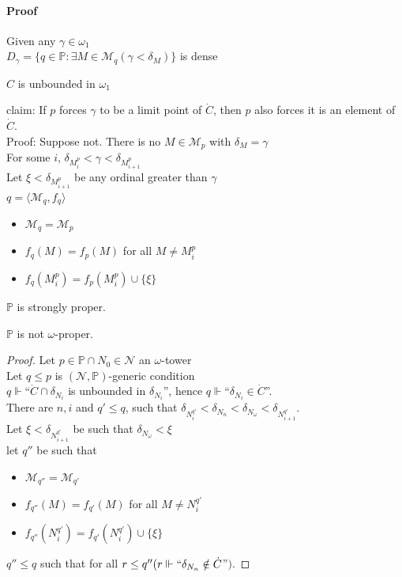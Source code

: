 \documentclass{beamer}
\begin{document}
\begin{frame}
\framesubtitle{Proof}
Given any $\gamma \in \omega_1$\\
\pause
$D_{\gamma}= \{q \in \mathbb{P} \colon \exists M \in \mathcal{M}_q(\gamma < \delta_M)\}$ is dense
\pause
\begin{center}
 $C$ is unbounded in $\omega_1$
\end{center}
\pause
claim: If $p$ forces $\gamma$ to be a limit point of $\dot{C}$, then $p$ also forces it is an element of $\dot{C}$.\\
\pause
Proof: Suppose not. \pause There is no $M \in \mathcal{M}_p$ with $\delta_{M}= \gamma$\\
\pause
For some $i$, $\delta_{M^p_i} < \gamma < \delta_{M^p_{i+1}}$\\
\pause 
Let $\xi < \delta_{M^p_{i+1}}$ be any ordinal greater than $\gamma$\\
\pause
$q= \langle \mathcal{M}_q, f_q \rangle$
\begin{itemize}
\item
$\mathcal{M}_q= \mathcal{M}_p$
\item
$f_q(M)=f_p(M)$ for all $M \neq {M^p_{i}}$
\item
$f_q({M^p_{i}})=f_p({M^p_{i}}) \cup \{\xi\}$
\end{itemize}
\end{frame}
\begin{frame}
\begin{block}{}
$\mathbb{P}$ is strongly proper.
\end{block}
\begin{block}{}
$\mathbb{P}$ is not  $\omega$-proper.
\end{block}
\begin{proof}
Let $p \in \mathbb{P} \cap N_0\in \mathcal{N}$ an $\omega$-tower\\
\pause
Let $q \leq p$ is $(\mathcal{N}, \mathbb{P})$-generic condition\\
\pause
$q \Vdash$``$\dot{C} \cap \delta_{N_i}$ is unbounded in $\delta_{N_i}$'', hence $q \Vdash$``$ \delta_{N_i} \in \dot{C}$''.\\

There are $n, i$ and $q' \leq q$,  such that $\delta_{N^{q'}_i} < \delta_{N_n} < \delta_{N_{\omega}} <\delta_{N^{q'}_{i+1}}$.\\
\pause
Let $\xi < \delta_{N^{q'}_{i+1}}$ be such that $\delta_{N_\omega} < \xi$\\
\pause
let $q''$ be such that
\begin{itemize}
\item
$\mathcal{M}_{q''}= \mathcal{M}_{q'}$
\item 
$f_{q''}(M)= f_{q'}(M)$ for all $M \neq N^{q'}_{i}$
\item 
$f_{q''}(N^{q'}_{i})= f_{q'}(N^{q'}_{i}) \cup \{\xi\}$
\end{itemize}
\pause
$q'' \leq q$ such that for all $r \leq q''(r \Vdash `` \delta_{N_n} \notin \dot{C}$''$)$.
\end{proof}
\end{frame}
\end{document}

